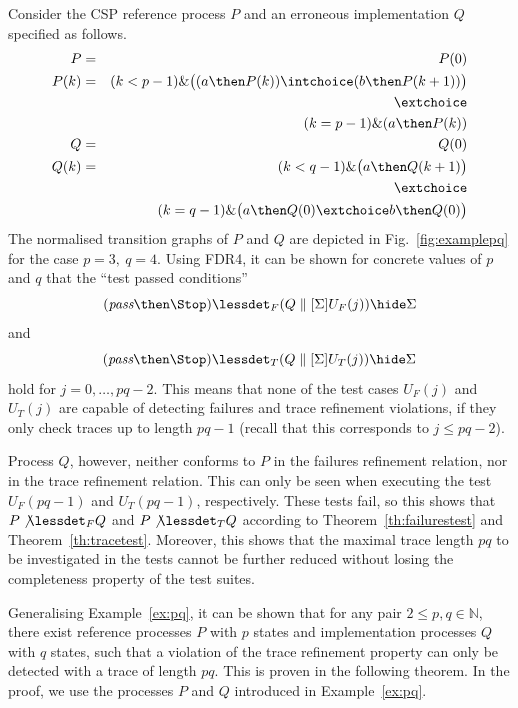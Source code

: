 \begin{example}\label{ex:pq}
Consider the CSP reference process $P$ and an erroneous implementation $Q$
specified as follows.
%
\begin{eqnarray*}
P & = &  P(0)
\\
P(k) & = & (k < p-1) \& \big( (a \then P(k)) \intchoice ( b \then P(k+1))\big)
\\ & & \extchoice
\\ & & (k = p-1) \& (a \then P(k))
\\
Q & = & Q(0)
\\
Q(k) & = & (k < q-1) \& \big( a \then Q(k+1)    \big)
\\ & & \extchoice
\\ & & ( k = q-1)\& \big( a\then Q(0) \extchoice b\then Q(0)  \big)
\end{eqnarray*}
%
The normalised transition graphs of $P$ and $Q$ are depicted in
Fig.~\ref{fig:examplepq} for the case $p=3,\ q=4$. Using FDR4, it can be
shown for concrete values of $p$ and $q$ that the  ``test passed conditions''
\[
(\epass\then\Stop) \lessdet_F (Q\parallel[\Sigma] U_F(j))\hide \Sigma
\]
and
\[
(\epass\then\Stop) \lessdet_T (Q\parallel[\Sigma] U_T(j))\hide \Sigma
\]
hold for $j = 0,\dots,pq-2$. This means that none of the test cases $U_F(j)$
and $U_T(j)$ are capable of detecting failures and trace refinement
violations, if they only check traces up to length $pq-1$
(recall that this corresponds to $j\le pq-2$).

Process $Q$, however, neither conforms to $P$ in the failures refinement
relation, nor in the trace
refinement relation. This can only be seen when executing the test $U_F(pq-1)$ and
$U_T(pq-1)$, respectively. These tests fail, so this shows that $P\not\lessdet_F Q$ and
$P\not\lessdet_T Q$ according to Theorem~\ref{th:failurestest} and Theorem~\ref{th:tracetest}. Moreover, this shows that
the maximal trace
length $pq$ to be investigated in the tests cannot be further reduced without losing
the completeness property of the test suites.
\xbox
\end{example}
%
Generalising Example~\ref{ex:pq}, it can be shown that for any pair
$2\le p,q \in\mathbb{N}$,
there exist reference processes $P$ with $p$ states
and implementation processes $Q$ with $q$ states, such that
a violation of the trace refinement property
can only be detected with a trace of length $pq$. This is proven in the following
theorem. In the proof, we use the processes $P$ and $Q$ introduced in Example~\ref{ex:pq}.


